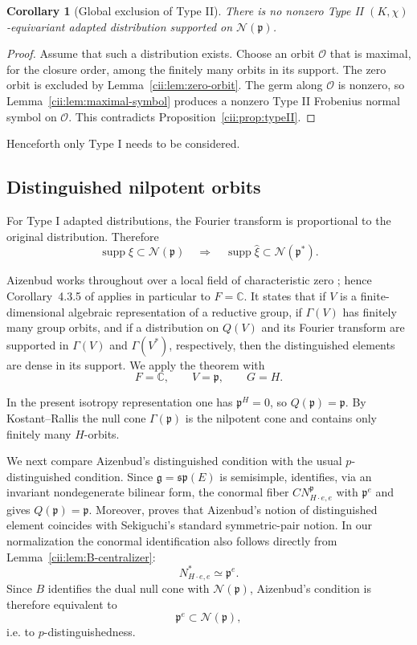 \documentclass[11pt,reqno]{amsart}
\numberwithin{equation}{section}
\newtheorem{corollary}[theorem]{Corollary}
\theoremstyle{definition}
\theoremstyle{remark}
\newcommand{\C}{\mathbb C}
\newcommand{\supp}{\operatorname{supp}}
\newcommand{\cN}{\mathcal N}
\begin{document}
\begin{corollary}[Global exclusion of Type II]
\label{cii:cor:no-typeII-distribution}
There is no nonzero Type II $(K,\chi)$-equivariant adapted distribution
supported on $\cN(\mathfrak p)$.
\end{corollary}

\begin{proof}
Assume that such a distribution exists.  Choose an orbit $\mathcal O$ that is
maximal, for the closure order, among the finitely many orbits in its support.
The zero orbit is excluded by Lemma~\ref{cii:lem:zero-orbit}.  The germ along
$\mathcal O$ is nonzero, so Lemma~\ref{cii:lem:maximal-symbol} produces a
nonzero Type II Frobenius normal symbol on $\mathcal O$.  This contradicts
Proposition~\ref{cii:prop:typeII}.
\end{proof}

Henceforth only Type I needs to be considered.

\subsection{Distinguished nilpotent orbits}\label{cii:sec:distinguished}

For Type I adapted distributions, the Fourier transform is proportional to
the original distribution.  Therefore
\[
\supp\xi\subset\cN(\mathfrak p)
\quad\Longrightarrow\quad
\supp\widehat{\xi}\subset\cN(\mathfrak p^*).
\]

Aizenbud works throughout over a local field of characteristic zero
\cite[\S2]{Aiz13}; hence Corollary~4.3.5 of \cite{Aiz13} applies in
particular to \(F=\C\).  It states that
if \(V\) is a finite-dimensional algebraic representation of a reductive group, if
\(\Gamma(V)\) has finitely many group orbits, and if a distribution on
\(Q(V)\) and its Fourier transform are supported in
\(\Gamma(V)\) and \(\Gamma(V^*)\), respectively, then the distinguished
elements are dense in its support.  We apply the theorem with
\[
F=\C,\qquad V=\mathfrak p,\qquad G=H.
\]

In the present isotropy representation one has \(\mathfrak p^H=0\), so
\(Q(\mathfrak p)=\mathfrak p\).  By Kostant--Rallis \cite{KR} the null cone
\(\Gamma(\mathfrak p)\) is the nilpotent cone and contains only finitely
many \(H\)-orbits.

We next compare Aizenbud's distinguished condition with the usual
\(p\)-distinguished condition.  Since
\(\mathfrak g=\mathfrak{sp}(E)\) is semisimple,
\cite[Lemma~5.1.40]{Aiz13} identifies, via an invariant
nondegenerate bilinear form, the conormal fiber
\(CN^{\mathfrak p}_{H\cdot e,e}\) with \(\mathfrak p^e\) and gives
\(Q(\mathfrak p)=\mathfrak p\).  Moreover,
\cite[Lemma~5.2.2]{Aiz13} proves that Aizenbud's notion of
distinguished element coincides with Sekiguchi's standard symmetric-pair
notion.  In our normalization the conormal identification also follows
directly from Lemma~\ref{cii:lem:B-centralizer}:
\[
  N^*_{H\cdot e,e}\simeq\mathfrak p^e.
\]
Since \(B\) identifies the dual null cone with \(\mathcal N(\mathfrak p)\),
Aizenbud's condition is therefore equivalent to
\[
  \mathfrak p^e\subset\mathcal N(\mathfrak p),
\]
i.e. to \(p\)-distinguishedness.
\end{document}
